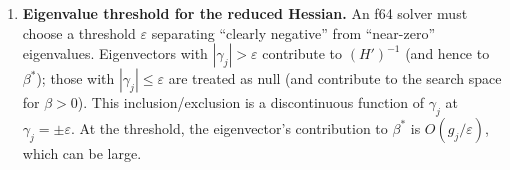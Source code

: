\begin{remark}
\begin{enumerate}
  \item \textbf{Eigenvalue threshold for the reduced Hessian.}
    An f64 solver must choose a threshold $\varepsilon$ separating
    ``clearly negative'' from ``near-zero'' eigenvalues.
    Eigenvectors with $|\gamma_j| > \varepsilon$ contribute to
    $(H')^{-1}$ (and hence to $\beta^*$); those with
    $|\gamma_j| \leq \varepsilon$ are treated as null
    (and contribute to the search space for $\beta > 0$).
    This inclusion/exclusion is a discontinuous function of
    $\gamma_j$ at $\gamma_j = \pm\varepsilon$.
    At the threshold, the eigenvector's contribution to
    $\beta^*$ is $O(g_j / \varepsilon)$, which can be large.

\end{enumerate}
\end{remark}
